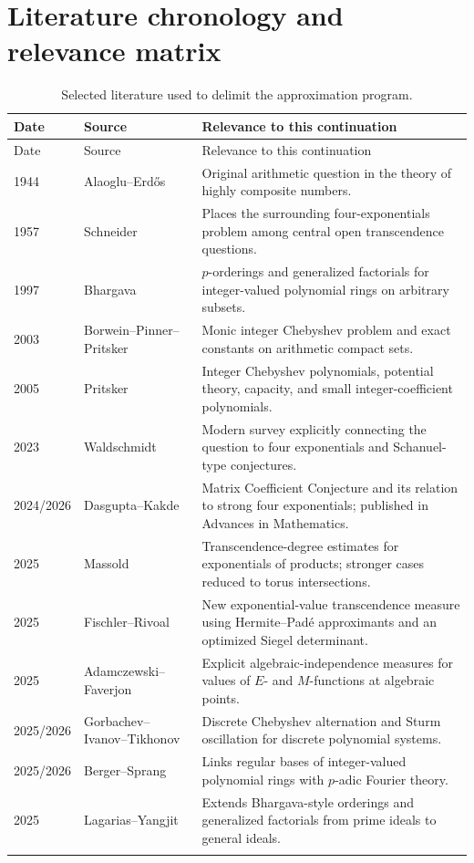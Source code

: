 \documentclass[11pt,oneside]{article}
\theoremstyle{definition}
\theoremstyle{remark}
\begin{document}
\section{Literature chronology and relevance matrix}
\label{app:literature}

\begin{longtable}{p{}p{}p{}}
\toprule
Date & Source & Relevance to this continuation \\
\midrule
\endfirsthead
\toprule
Date & Source & Relevance to this continuation \\
\midrule
\endhead
1944 & Alaoglu--Erd\H{o}s & Original arithmetic question in the theory of highly composite numbers. \\
1957 & Schneider & Places the surrounding four-exponentials problem among central open transcendence questions. \\
1997 & Bhargava & $p$-orderings and generalized factorials for integer-valued polynomial rings on arbitrary subsets. \\
2003 & Borwein--Pinner--Pritsker & Monic integer Chebyshev problem and exact constants on arithmetic compact sets. \\
2005 & Pritsker & Integer Chebyshev polynomials, potential theory, capacity, and small integer-coefficient polynomials. \\
2023 & Waldschmidt & Modern survey explicitly connecting the question to four exponentials and Schanuel-type conjectures. \\
2024/2026 & Dasgupta--Kakde & Matrix Coefficient Conjecture and its relation to strong four exponentials; published in Advances in Mathematics. \\
2025 & Massold & Transcendence-degree estimates for exponentials of products; stronger cases reduced to torus intersections. \\
2025 & Fischler--Rivoal & New exponential-value transcendence measure using Hermite--Pad\'e approximants and an optimized Siegel determinant. \\
2025 & Adamczewski--Faverjon & Explicit algebraic-independence measures for values of $E$- and $M$-functions at algebraic points. \\
2025/2026 & Gorbachev--Ivanov--Tikhonov & Discrete Chebyshev alternation and Sturm oscillation for discrete polynomial systems. \\
2025/2026 & Berger--Sprang & Links regular bases of integer-valued polynomial rings with $p$-adic Fourier theory. \\
2025 & Lagarias--Yangjit & Extends Bhargava-style orderings and generalized factorials from prime ideals to general ideals. \\
\bottomrule
\caption{Selected literature used to delimit the approximation program.}
\label{tab:literature}
\end{longtable}
\end{document}
